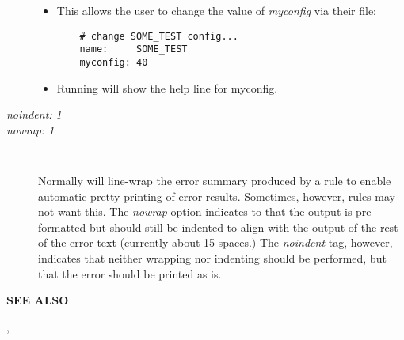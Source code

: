 \begin{description}
\begin{itemize}
\item This allows the user to change the value of {\it myconfig} via
their  file:

\begin{verbatim}
    # change SOME_TEST config...
    name:     SOME_TEST
    myconfig: 40
\end{verbatim}

\item Running  will show the help line for myconfig.

\end{itemize}


\item [{\it noindent: 1}]
\item [{\it nowrap: 1}]\verb" "

Normally  will line-wrap the error summary produced by a rule
to enable automatic pretty-printing of error results.  Sometimes,
however, rules may not want this.  The {\it nowrap} option indicates to
 that the output is pre-formatted but should still be indented
to align with the output of the rest of the error text (currently about
15 spaces.)  The {\it noindent} tag, however, indicates that neither
wrapping nor indenting should be performed, but that the error should
be printed as is.

\end{description}

{\bf SEE ALSO}


, 
